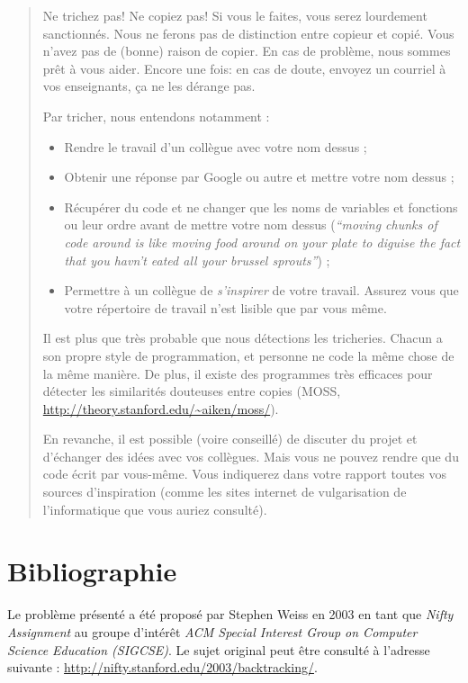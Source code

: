 \documentclass[10pt]{article}
\begin{document}
\begin{quote}
Ne trichez pas! Ne copiez pas!
Si vous le faites, vous serez lourdement sanctionnés. Nous ne ferons pas de distinction entre copieur et copié.
Vous n'avez pas de (bonne) raison de copier. En cas de problème, nous sommes prêt à vous aider. 
Encore une fois: en cas de doute, envoyez un courriel à vos enseignants, ça ne les dérange pas.

Par tricher, nous entendons notamment :
\begin{itemize}
  \item Rendre le travail d'un collègue avec votre nom dessus ;
  \item Obtenir une réponse par Google\texttrademark{} ou autre et mettre votre nom dessus ;
  \item Récupérer du code et ne changer que les noms de variables et fonctions ou leur ordre avant de mettre votre nom dessus
      (\emph{``moving chunks of code around is like moving food around on your plate to diguise the fact that you havn't eated all your brussel sprouts''}) ;
  \item Permettre à un collègue de \emph{s'inspirer} de votre travail. Assurez vous que votre répertoire de travail n'est lisible que par vous même.
\end{itemize}

Il est plus que très probable que nous détections les tricheries. Chacun a son propre style de programmation, et personne ne code la même chose de la même manière. De plus, il existe des programmes très efficaces pour détecter les similarités douteuses entre copies (MOSS, \url{http://theory.stanford.edu/~aiken/moss/}).

\medskip
En revanche, il est possible (voire conseillé) de discuter du projet et
d'échanger des idées avec vos collègues. Mais vous ne pouvez rendre que du code
écrit par vous-même. Vous indiquerez dans votre rapport toutes vos sources
d'inspiration (comme les sites internet de vulgarisation de l'informatique que
vous auriez consulté).

\end{quote}


\section*{Bibliographie}

Le problème présenté a été proposé par Stephen Weiss en 2003 en tant que \emph{Nifty Assignment} au groupe 
d'intérêt \emph{ACM Special Interest Group on Computer Science Education (SIGCSE)}. Le sujet original peut être consulté à l'adresse suivante : \url{http://nifty.stanford.edu/2003/backtracking/}.
\end{document}
